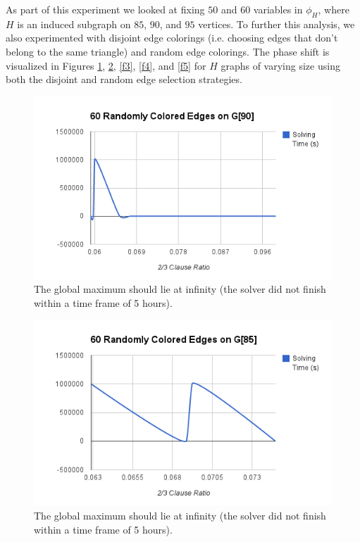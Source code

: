 \documentclass[paper=a4, fontsize=11pt]{scrartcl} %
\begin{document}
As part of this experiment we looked at fixing $50$ and $60$ variables in $\phi_H$,
where $H$ is an induced subgraph on $85$, $90$, and $95$ vertices. To further this analysis,
we also experimented with disjoint edge colorings (i.e. choosing edges that don't belong
to the same triangle) and random edge colorings. The phase shift is visualized in Figures 
\ref{f1}, \ref{f2}, \ref{f3}, \ref{f4}, and \ref{f5} for $H$ graphs of varying size using
both the disjoint and random edge selection strategies. 

\begin{figure}
\begin{center}
\includegraphics[scale=0.75]{chart_1.png}
\end{center}
\caption{The global maximum should lie at infinity (the solver did not finish within a time frame of 5 hours).} 
\label{f1}
\end{figure}

\begin{figure}
\begin{center}
\includegraphics[scale=0.75]{chart_2.png}
\end{center}
\caption{The global maximum should lie at infinity (the solver did not finish within a time frame of 5 hours).} 
\label{f2}
\end{figure}
\end{document}
